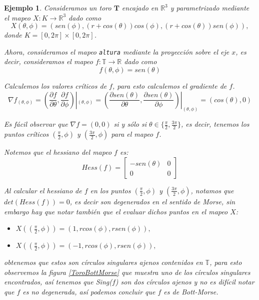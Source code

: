 \documentclass[a4paper,10pt]{book}
\newtheorem{eje}{Ejemplo}[chapter]
\begin{document}
\begin{eje}\label{ejeBM}
Consideramos un toro $\textbf{T}$ encajado en $\mathbb{R}^{3}$ y parametrizado mediante el mapeo  $X:K\to\mathbb{R}^{3}$ dado como 
$$X(\theta, \phi)= \left( sen(\phi), (r+cos(\theta))cos(\phi), (r+cos(\theta))sen(\phi) \right),$$
donde $K = [0,2\pi]\times [0,2\pi]$.
\vspace{5mm}

Ahora, consideramos el mapeo \texttt{altura}  mediante la proyecci\'on sobre el eje $x$, es decir, consideramos el mapeo 
$f:\mathbb{T}\to\mathbb{R}$ dado como 
\begin{equation}
f(\theta, \phi) = sen(\theta) 
\end{equation}

Calculemos los valores cr\'iticos de $f$, para esto calculemos el gradiente de $f$.
$$\nabla f_{(\theta,\phi)} = \left( \frac{\partial f}{\partial\theta}, \frac{\partial f}{\partial\phi} \right)|_{(\theta,\phi)} = \left( \frac{\partial sen(\theta)}{\partial\theta}, \frac{\partial sen(\theta)}{\partial\phi} \right)|_{(\theta,\phi)} = \left( cos(\theta), 0 \right)$$

Es f\'acil observar que $\nabla f = (0,0)$ si y s\'olo si $\theta\in\{\frac{\pi}{2},\frac{3\pi}{2}\}$, es decir, tenemos los puntos cr\'iticos $(\frac{\pi}{2},\phi)$ y $(\frac{3\pi}{2},\phi)$ para el mapeo $f$.   
\vspace{5mm}

Notemos que el hessiano del mapeo  $f$ es:
\begin{equation*}
Hess(f)= \left[ 
\begin{array}{cc}
-sen(\theta) & 0 \\
0            & 0
\end{array} \right]
\end{equation*}

Al calcular el hessiano de $f$ en los puntos $(\frac{\pi}{2},\phi)$ y $(\frac{3\pi}{2},\phi)$, notamos que $det(Hess(f))=0$, es decir son degenerados en el sentido de Morse, sin embargo hay que notar tambi\'en que el evaluar dichos puntos en el mapeo $X$: 
\begin{itemize}
    \item $X((\frac{\pi}{2},\phi))=(1, rcos(\phi), rsen(\phi)),$ 
    \item $X((\frac{\pi}{2},\phi))=(-1, rcos(\phi), rsen(\phi)),$
\end{itemize}
obtenemos que estos son c\'irculos singulares ajenos contenidos en $\mathbb{T}$, para esto observemos la figura \ref{ToroBottMorse} que muestra uno de los c\'irculos singulares encontrados, as\'i tenemos que {\rm Sing($f$)} son dos c\'irculos ajenos y no es dif\'icil notar que $f$ es no degenerada, as\'i podemos concluir que $f$ es de Bott-Morse.  


\end{eje}
\end{document}
